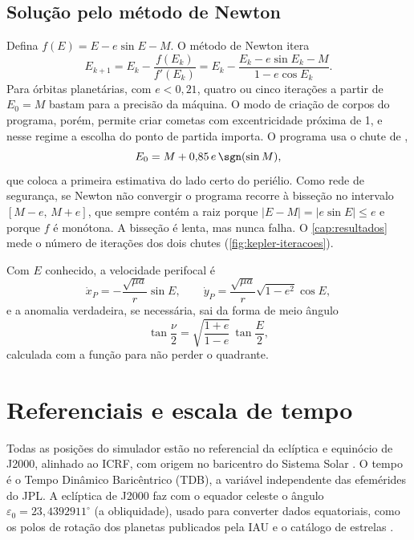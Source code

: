 \subsection{Solução pelo método de Newton}

Defina $f(E) = E - e\sin E - M$. O método de Newton itera
\begin{equation}
  E_{k+1} = E_k - \frac{f(E_k)}{f'(E_k)} = E_k - \frac{E_k - e\sin E_k - M}{1 - e\cos E_k}.
  \label{eq:newton-kepler}
\end{equation}
Para órbitas planetárias, com $e<0{,}21$, quatro ou cinco iterações a partir de $E_0 = M$ bastam para a precisão da máquina. O modo de criação de corpos do programa, porém, permite criar cometas com excentricidade próxima de 1, e nesse regime a escolha do ponto de partida importa. O programa usa o chute de ,
\begin{equation}
  E_0 = M + 0{,}85\,e\,\sgn(\sin M),
\end{equation}
que coloca a primeira estimativa do lado certo do periélio. Como rede de segurança, se Newton não convergir o programa recorre à bisseção no intervalo $[M-e,\,M+e]$, que sempre contém a raiz porque $|E-M| = |e\sin E| \leq e$ e porque $f$ é monótona. A bisseção é lenta, mas nunca falha. O \autoref{cap:resultados} mede o número de iterações dos dois chutes (\autoref{fig:kepler-iteracoes}).

Com $E$ conhecido, a velocidade perifocal é
\begin{equation}
  \dot{x}_P = -\frac{\sqrt{\mu a}}{r}\sin E,\qquad \dot{y}_P = \frac{\sqrt{\mu a}}{r}\sqrt{1-e^2}\cos E,
\end{equation}
e a anomalia verdadeira, se necessária, sai da forma de meio ângulo
\[
  \tan\frac{\nu}{2} = \sqrt{\frac{1+e}{1-e}}\,\tan\frac{E}{2},
\]
calculada com a função  para não perder o quadrante.

\section{Referenciais e escala de tempo}

Todas as posições do simulador estão no referencial da eclíptica e equinócio de J2000, alinhado ao ICRF, com origem no baricentro do Sistema Solar \cite{park2021}. O tempo é o Tempo Dinâmico Baricêntrico (TDB), a variável independente das efemérides do JPL. A eclíptica de J2000 faz com o equador celeste o ângulo $\varepsilon_0 = 23{,}4392911^\circ$ (a obliquidade), usado para converter dados equatoriais, como os polos de rotação dos planetas publicados pela IAU \cite{archinal2018} e o catálogo de estrelas \cite{hoffleit1991}.

